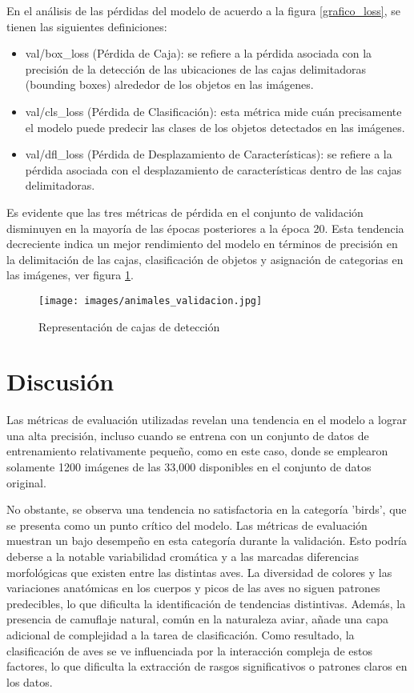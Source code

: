 \documentclass[journal]{IEEEtran}
\begin{document}
En el análisis de las pérdidas del modelo de acuerdo a la figura \ref{grafico_loss}, se tienen las siguientes definiciones:

\begin{itemize}
    \item val/box\_loss (Pérdida de Caja): se refiere a la pérdida asociada con la precisión de la detección de las ubicaciones de las cajas delimitadoras (bounding boxes) alrededor de los objetos en las imágenes.
    \item val/cls\_loss (Pérdida de Clasificación): esta métrica mide cuán precisamente el modelo puede predecir las clases de los objetos detectados en las imágenes.
    \item val/dfl\_loss (Pérdida de Desplazamiento de Características): se refiere a la pérdida asociada con el desplazamiento de características dentro de las cajas delimitadoras.
\end{itemize}

Es evidente que las tres métricas de pérdida en el conjunto de validación disminuyen en la mayoría de las épocas posteriores a la época 20. Esta tendencia decreciente indica un mejor rendimiento del modelo en términos de precisión en la delimitación de las cajas, clasificación de objetos y asignación de categorias en las imágenes, ver figura \ref{valAniaml}.

\begin{figure}[!h]
  \centering
  \texttt{[image: images/animales\_validacion.jpg]}
  \caption{Representación de cajas de detección}
  \label{valAniaml}
\end{figure}
\section{Discusión}
Las métricas de evaluación utilizadas revelan una tendencia en el modelo a lograr una alta precisión, incluso cuando se entrena con un conjunto de datos de entrenamiento relativamente pequeño, como en este caso, donde se emplearon solamente 1200 imágenes de las 33,000 disponibles en el conjunto de datos original.

No obstante, se observa una tendencia no satisfactoria en la categoría 'birds', que se presenta como un punto crítico del modelo. Las métricas de evaluación muestran un bajo desempeño en esta categoría durante la validación. Esto podría deberse a la notable variabilidad cromática y a las marcadas diferencias morfológicas que existen entre las distintas aves. La diversidad de colores y las variaciones anatómicas en los cuerpos y picos de las aves no siguen patrones predecibles, lo que dificulta la identificación de tendencias distintivas. Además, la presencia de camuflaje natural, común en la naturaleza aviar, añade una capa adicional de complejidad a la tarea de clasificación. Como resultado, la clasificación de aves se ve influenciada por la interacción compleja de estos factores, lo que dificulta la extracción de rasgos significativos o patrones claros en los datos.
\end{document}

